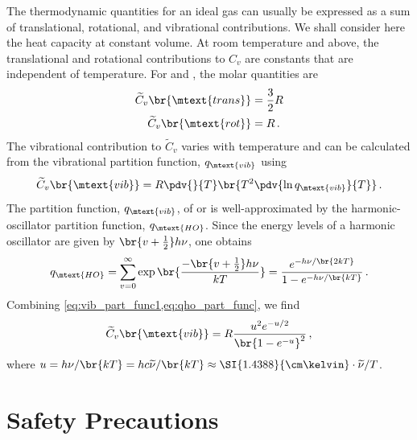 The thermodynamic quantities for an ideal gas can usually be expressed as a sum of translational, rotational, and vibrational contributions. 
We shall consider here the heat capacity at constant volume. 
At room temperature and above, the translational and rotational contributions to \( C_v \) are constants that are independent of temperature. 
For  and , the molar quantities are 
\begin{align}
	\begin{split}
		\widetilde{C}_v\br{\mtext{trans}}	&=	\frac{3}{2}R \\
		\widetilde{C}_v\br{\mtext{rot}}		&=	R \, .
	\end{split}
	\label{eq:c_v_rot_vib}
\end{align}
The vibrational contribution to \( \widetilde{C}_v \) varies with temperature and can be calculated from the vibrational partition function, \( q_\mtext{vib} \) using 
\begin{equation}
	\widetilde{C}_v\br{\mtext{vib}} = R \pdv{}{T} \br{T^2 \pdv{\ln{q_\mtext{vib}}}{T}} \, .
	\label{eq:vib_part_func1}
\end{equation}
The partition function, \( q_\mtext{vib} \), of  or  is well-approximated by the harmonic-oscillator partition function, \( q_\mtext{HO} \). 
Since the energy levels of a harmonic oscillator are given by \( \br{v + \tfrac{1}{2}} h \nu \), one obtains~\autocite{levine95}
\begin{equation}
	q_\mtext{HO} = \sum_{v = 0}^\infty \exp \br{\frac{-\br{v + \tfrac{1}{2}} h \nu}{k T}} = \frac{e^{-h \nu/\br{2kT}}}{{1 - e^{-h \nu / \br{k T}}}} \, .
	\label{eq:qho_part_func}
\end{equation}
Combining \cref{eq:vib_part_func1,eq:qho_part_func}, we find 
\begin{equation}
	\widetilde{C}_v\br{\mtext{vib}} = R \frac{u^2 e^{-u/2}}{\br{1 - e^{-u}}^2} \, ,
	\label{eq:vib_part_func2}
\end{equation}
where \( u = h \nu / \br{kT} = h c \widetilde{\nu} / \br{k T} \approx \SI{1.4388}{\cm\kelvin} \cdot \widetilde{\nu} / T \). 




\pagebreak

\section{Safety Precautions} %
\label{sec:safety}

